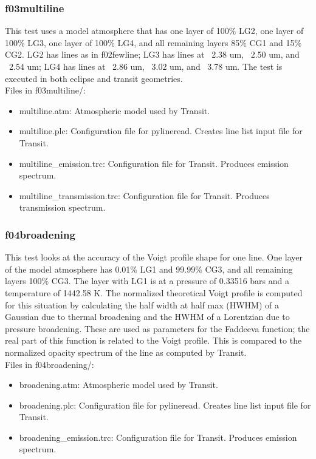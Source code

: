 \documentclass[letterpaper, 12pt]{article}
\begin{document}
\subsubsection{f03multiline}
\label{sec:multiline}
This test uses a model atmosphere that has one layer of 100\% LG2, one layer 
of 100\% LG3, one layer of 100\% LG4, and all remaining layers 85\% CG1 and 
15\% CG2. LG2 has lines as in f02fewline; LG3 has lines at ~2.38 um, ~2.50 um, 
and ~2.54 um; LG4 has lines at ~2.86 um, ~3.02 um, and ~3.78 um. The test is 
executed in both eclipse and transit geometries.\\

Files in f03multiline/:
\begin{itemize} \itemsep0pt
  \item multiline.atm: Atmospheric model used by Transit.
  \item multiline.plc: Configuration file for pylineread. Creates line 
        list input file for Transit.
  \item multiline{\_}emission.trc: Configuration file for Transit. Produces 
        emission spectrum.
  \item multiline{\_}transmission.trc: Configuration file for Transit. Produces 
        transmission spectrum.
\end{itemize}

\subsubsection{f04broadening}
\label{sec:broadening}
This test looks at the accuracy of the Voigt profile shape for one line. 
One layer of the model atmosphere has 0.01\% LG1 and 99.99\% CG3, and 
all remaining layers 100\% CG3. The layer with LG1 is at a pressure of 
0.33516 bars and a temperature of 1442.58 K. The normalized theoretical Voigt 
profile is computed for this situation by calculating the half width at 
half max (HWHM) of a Gaussian due to thermal broadening and the HWHM of 
a Lorentzian due to pressure broadening. These are used as parameters for 
the Faddeeva function; the real part of this function is related to the 
Voigt profile. This is compared to the normalized opacity spectrum of the 
line as computed by Transit.\\

Files in f04broadening/:
\begin{itemize} \itemsep0pt
  \item broadening.atm: Atmospheric model used by Transit.
  \item broadening.plc: Configuration file for pylineread. Creates line 
        list input file for Transit.
  \item broadening{\_}emission.trc: Configuration file for Transit. Produces 
        emission spectrum.
\end{itemize}
\end{document}
